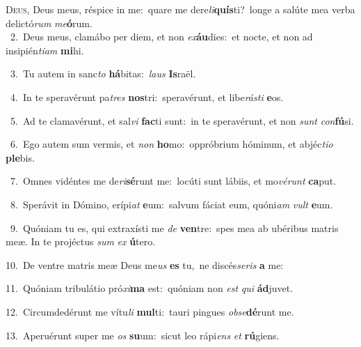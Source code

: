 \lettrine{\initial\textcolor{\initialcolor}{D}}{eus,} Deus meus, réspice in me:~\dagger quare me dere\-\textit{li}\-\textbf{quís}ti?~\star longe a salúte mea verba delictó\textit{rum} \textit{me}\-\textbf{ó}rum.\\
{\numbfont\textcolor{\numbcolor}{~2.}}~Deus meus, clamábo per diem, et non \textit{ex}\-\textbf{áu}dies:~\star et nocte, et non ad insipién\-\textit{ti}\-\textit{am} \textbf{mi}\-hi.\par
{\numbfont\textcolor{\numbcolor}{~3.}}~Tu autem in sanc\textit{to} \textbf{há}\-bitas:~\star \textit{laus} \textbf{Is}\-raël.\par
{\numbfont\textcolor{\numbcolor}{~4.}}~In te speravérunt pa\textit{tres} \textbf{nos}\-tri:~\star speravérunt, et libe\-\textit{rás}\-\textit{ti} \textbf{e}\-os.\par
{\numbfont\textcolor{\numbcolor}{~5.}}~Ad te clamavérunt, et sal\textit{vi} \textbf{fac}\-ti sunt:~\star in te speravérunt, et non \textit{sunt} \textit{con}\-\textbf{fú}si.\par
{\numbfont\textcolor{\numbcolor}{~6.}}~Ego autem sum vermis, et \textit{non} \textbf{ho}\-mo:~\star oppróbrium hóminum, et abjéc\-\textit{ti}\-\textit{o} \textbf{ple}\-bis.\par
{\numbfont\textcolor{\numbcolor}{~7.}}~Omnes vidéntes me de\-\textit{ri}\-\textbf{sé}runt me:~\star locúti sunt lábiis, et mo\-\textit{vé}\-\textit{runt} \textbf{ca}\-put.\par
{\numbfont\textcolor{\numbcolor}{~8.}}~Sperávit in Dómino, erípi\textit{at} \textbf{e}\-um:~\star salvum fáciat eum, quóni\textit{am} \textit{vult} \textbf{e}\-um.\par
{\numbfont\textcolor{\numbcolor}{~9.}}~Quóniam tu es, qui extraxísti me \textit{de} \textbf{ven}\-tre:~\star spes mea ab ubéribus matris meæ. In te projéctus \textit{sum} \textit{ex} \textbf{ú}\-tero.\par
{\numbfont\textcolor{\numbcolor}{10.}}~De ventre matris meæ Deus me\textit{us} \textbf{es} tu,~\star ne discés\-\textit{se}\-\textit{ris} \textbf{a} me:\par
{\numbfont\textcolor{\numbcolor}{11.}}~Quóniam tribulátio pró\-\textit{xi}\-\textbf{ma} est:~\star quóniam non \textit{est} \textit{qui} \textbf{ád}\-juvet.\par
{\numbfont\textcolor{\numbcolor}{12.}}~Circumdedérunt me vítu\textit{li} \textbf{mul}\-ti:~\star tauri pingues \textit{ob}\-\textit{se}\textbf{dé}runt me.\par
{\numbfont\textcolor{\numbcolor}{13.}}~Aperuérunt super me \textit{os} \textbf{su}\-um:~\star sicut leo rápi\textit{ens} \textit{et} \textbf{rú}\-giens.\par

